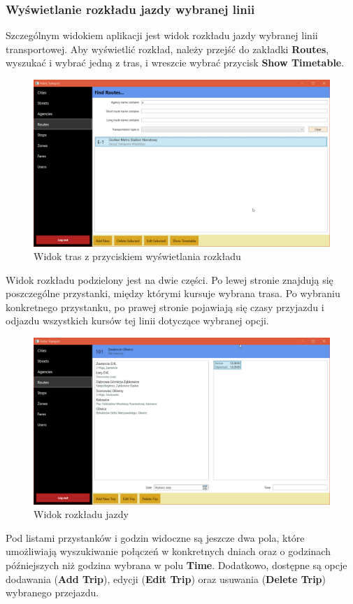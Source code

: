 \documentclass[10pt,a4paper]{article}
\begin{document}
\subsubsection{Wyświetlanie rozkładu jazdy wybranej linii}
Szczególnym widokiem aplikacji jest widok rozkładu jazdy wybranej linii transportowej. Aby wyświetlić rozkład, należy przejść do zakładki \textbf{Routes}, wyszukać i wybrać jedną z tras, i wreszcie wybrać przycisk \textbf{Show Timetable}.
\begin{figure}[H]
	\centering
	\includegraphics[width=15cm]{screenshots/09_filter_route.png}
	\caption{Widok tras z przyciskiem wyświetlania rozkładu}
\end{figure}
Widok rozkładu podzielony jest na dwie części. Po lewej stronie znajdują się poszczególne przystanki, między którymi kursuje wybrana trasa. Po wybraniu konkretnego przystanku, po prawej stronie pojawiają się czasy przyjazdu i odjazdu wszystkich kursów tej linii dotyczące wybranej opcji.
\begin{figure}[H]
	\centering
	\includegraphics[width=15cm]{screenshots/10_timetable.png}
	\caption{Widok rozkładu jazdy}
\end{figure}
Pod listami przystanków i godzin widoczne są jeszcze dwa pola, które umożliwiają wyszukiwanie połączeń w konkretnych dniach oraz o godzinach późniejszych niż godzina wybrana w polu \textbf{Time}. Dodatkowo, dostępne są opcje dodawania (\textbf{Add Trip}), edycji (\textbf{Edit Trip}) oraz usuwania (\textbf{Delete Trip}) wybranego przejazdu.
\end{document}

